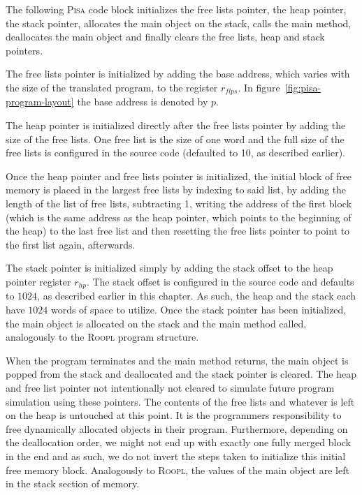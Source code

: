 The following \textsc{Pisa} code block initializes the free lists pointer, the heap pointer, the stack pointer, allocates the main object on the stack, calls the main method, deallocates the main object and finally clears the free lists, heap and stack pointers.

The free lists pointer is initialized by adding the base address, which varies with the size of the translated program, to the register $r_{flps}$. In figure~\ref{fig:pisa-program-layout} the base address is denoted by $p$.

The heap pointer is initialized directly after the free lists pointer by adding the size of the free lists. One free list is the size of one word and the full size of the free lists is configured in the source code (defaulted to 10, as described earlier).

Once the heap pointer and free lists pointer is initialized, the initial block of free memory is placed in the largest free lists by indexing to said list, by adding the length of the list of free lists, subtracting 1, writing the address of the first block (which is the same address as the heap pointer, which points to the beginning of the heap) to the last free list and then resetting the free lists pointer to point to the first list again, afterwards.

The stack pointer is initialized simply by adding the stack offset to the heap pointer register $r_{hp}$. The stack offset is configured in the source code and defaults to $1024$, as described earlier in this chapter. As such, the heap and the stack each have $1024$ words of space to utilize. Once the stack pointer has been initialized, the main object is allocated on the stack and the main method called, analogously to the \textsc{Roopl} program structure.

When the program terminates and the main method returns, the main object is popped from the stack and deallocated and the stack pointer is cleared. The heap and free list pointer not intentionally not cleared to simulate future program simulation using these pointers. The contents of the free lists and whatever is left on the heap is untouched at this point. It is the programmers responsibility to free dynamically allocated objects in their \rooplpp program. Furthermore, depending on the deallocation order, we might not end up with exactly one fully merged block in the end and as such, we do not invert the steps taken to initialize this initial free memory block.
Analogously to \textsc{Roopl}, the values of the main object are left in the stack section of memory.


